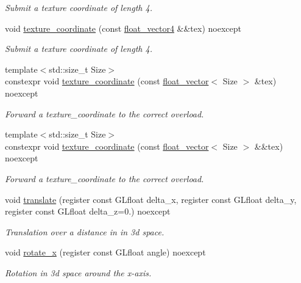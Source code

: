 \begin{DoxyCompactItemize}
\begin{DoxyCompactList}\small\item\em Submit a texture coordinate of length 4. \end{DoxyCompactList}\item 
void \hyperlink{namespaceglpp_a727361510680fdf574b07ab54e008301}{texture\+\_\+coordinate} (const \hyperlink{namespaceglpp_ab4a3d7b8ed8e2e4810006eef5213a460}{float\+\_\+vector4} \&\&tex) noexcept
\begin{DoxyCompactList}\small\item\em Submit a texture coordinate of length 4. \end{DoxyCompactList}\item 
{\footnotesize template$<$std\+::size\+\_\+t Size$>$ }\\constexpr void \hyperlink{namespaceglpp_a8064de92190f865e6119e1f1639046c6}{texture\+\_\+coordinate} (const \hyperlink{namespaceglpp_a6c618584338a9ebf15759cea2401f0ae}{float\+\_\+vector}$<$ Size $>$ \&tex) noexcept
\begin{DoxyCompactList}\small\item\em Forward a texture\+\_\+coordinate to the correct overload. \end{DoxyCompactList}\item 
{\footnotesize template$<$std\+::size\+\_\+t Size$>$ }\\constexpr void \hyperlink{namespaceglpp_a64fd3eb027251d388a336ef0c31ad5cb}{texture\+\_\+coordinate} (const \hyperlink{namespaceglpp_a6c618584338a9ebf15759cea2401f0ae}{float\+\_\+vector}$<$ Size $>$ \&\&tex) noexcept
\begin{DoxyCompactList}\small\item\em Forward a texture\+\_\+coordinate to the correct overload. \end{DoxyCompactList}\item 
void \hyperlink{namespaceglpp_afc8e88a66e1fc8eb20c6733cf7bb03d4}{translate} (register const G\+Lfloat delta\+\_\+x, register const G\+Lfloat delta\+\_\+y, register const G\+Lfloat delta\+\_\+z=0.) noexcept
\begin{DoxyCompactList}\small\item\em Translation over a distance in in 3d space. \end{DoxyCompactList}\item 
void \hyperlink{namespaceglpp_af77d62a05c40cbf64fbf533e2de012f2}{rotate\+\_\+x} (register const G\+Lfloat angle) noexcept
\begin{DoxyCompactList}\small\item\em Rotation in 3d space around the x-\/axis. \end{DoxyCompactList}\item 

\end{DoxyCompactItemize}
